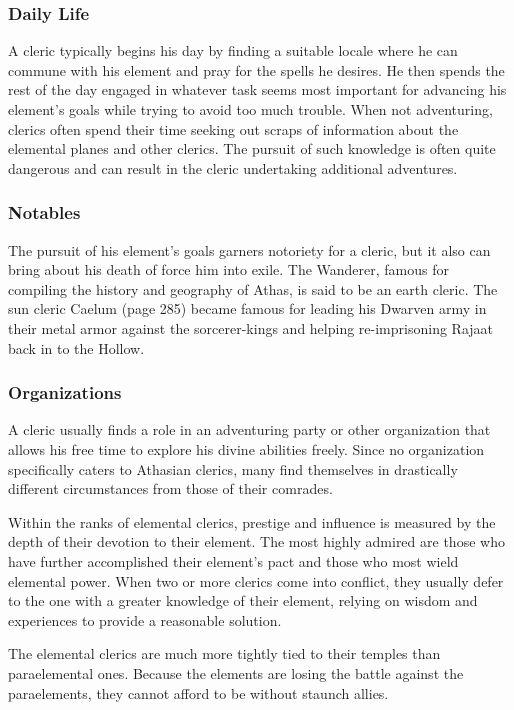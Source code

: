 \subsubsection{Daily Life}

A cleric typically begins his day by finding a suitable locale where he can commune with his element and pray for the spells he desires. He then spends the rest of the day engaged in whatever task seems most important for advancing his element's goals while trying to avoid too much trouble. When not adventuring, clerics often spend their time seeking out scraps of information about the elemental planes and other clerics. The pursuit of such knowledge is often quite dangerous and can result in the cleric undertaking additional adventures.

\subsubsection{Notables}

The pursuit of his element's goals garners notoriety for a cleric, but it also can bring about his death of force him into exile. The Wanderer, famous for compiling the history and geography of Athas, is said to be an earth cleric. The sun cleric Caelum (page 285) became famous for leading his Dwarven army in their metal armor against the sorcerer-kings and helping re-imprisoning Rajaat back in to the Hollow.

\subsubsection{Organizations}

A cleric usually finds a role in an adventuring party or other organization that allows his free time to explore his divine abilities freely. Since no organization specifically caters to Athasian clerics, many find themselves in drastically different circumstances from those of their comrades.

Within the ranks of elemental clerics, prestige and influence is measured by the depth of their devotion to their element. The most highly admired are those who have further accomplished their element's pact and those who most wield elemental power. When two or more clerics come into conflict, they usually defer to the one with a greater knowledge of their element, relying on wisdom and experiences to provide a reasonable solution.

The elemental clerics are much more tightly tied to their temples than paraelemental ones. Because the elements are losing the battle against the paraelements, they cannot afford to be without staunch allies.

